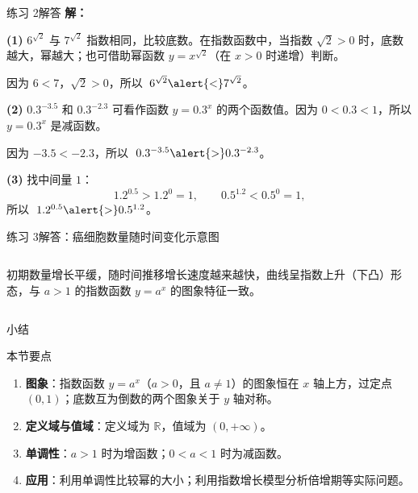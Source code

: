 \documentclass[aspectratio=169,11pt,t,fleqn]{ctexbeamer}
\begin{document}
\begin{frame}{练习 2\quad 解答}
  \small
  \textbf{解：}

  \textbf{(1)} $6^{\sqrt2}$ 与 $7^{\sqrt2}$ 指数相同，比较底数。在指数函数中，当指数 $\sqrt2>0$ 时，底数越大，幂越大；也可借助幂函数 $y=x^{\sqrt2}$（在 $x>0$ 时递增）判断。

  因为 $6<7$，$\sqrt2>0$，所以 $\;6^{\sqrt2}\alert{<}7^{\sqrt2}$。

  \vspace{0.6em}
  \textbf{(2)} $0.3^{-3.5}$ 和 $0.3^{-2.3}$ 可看作函数 $y=0.3^x$ 的两个函数值。因为 $0<0.3<1$，所以 $y=0.3^x$ 是\alert{减函数}。

  因为 $-3.5<-2.3$，所以 $\;0.3^{-3.5}\alert{>}0.3^{-2.3}$。

  \vspace{0.6em}
  \textbf{(3)} 找中间量 $1$：
  \[
    1.2^{0.5}>1.2^{0}=1,\qquad
    0.5^{1.2}<0.5^{0}=1,
  \]
  所以 $\;1.2^{0.5}\alert{>}0.5^{1.2}$。
\end{frame}

\begin{frame}{练习 3\quad 解答：癌细胞数量随时间变化示意图}
  \begin{columns}
    \centering

    \small
    初期数量增长平缓，随时间推移增长速度越来越快，曲线呈\alert{指数上升（下凸）}形态，与 $a>1$ 的指数函数 $y=a^x$ 的图象特征一致。
  \end{columns}
\end{frame}

\begin{frame}{小结}
  \begin{block}{本节要点}
    \begin{enumerate}[(1)]
      \item \textbf{图象}：指数函数 $y=a^x$（$a>0$，且 $a\neq1$）的图象恒在 $x$ 轴上方，过定点 $(0,1)$；底数互为倒数的两个图象关于 $y$ 轴对称。
      \item \textbf{定义域与值域}：定义域为 $\mathbb{R}$，值域为 $(0,+\infty)$。
      \item \textbf{单调性}：$a>1$ 时为增函数；$0<a<1$ 时为减函数。
      \item \textbf{应用}：利用单调性比较幂的大小；利用指数增长模型分析倍增期等实际问题。
    \end{enumerate}
  \end{block}
\end{frame}
\end{document}
